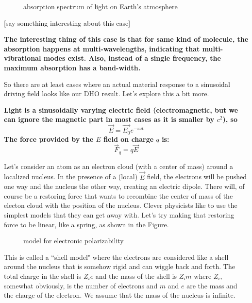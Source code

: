 \documentclass[]{revtex4}
\newcommand{\st}[1]{{\color{red}\bfseries #1}}
\begin{document}
  \begin{figure}[H]\begin{center}
      \caption{absorption spectrum of light on Earth's atmosphere}
  \end{center}\end{figure}
  [say something interesting about this case]
  
  \st{
    The interesting thing of this case is that for same kind of molecule, the absorption happens at multi-wavelengths, indicating that multi-vibrational modes exist. Also, instead of a single frequency, the maximum absorption has a band-width.
  }
  
  
  So there are at least cases where an actual material response to a sinusoidal driving field looks like our DHO result.  Let's explore this a bit more.
  
  \st{ Light is a sinusoidally varying electric field (electromagnetic, but we can ignore the magnetic part in most cases as it is smaller by $c^2$),
    so}
  \[\vec{E} = \vec{E_0}e^{-i\omega t}\]
  \st{
    The force provided by the $E$ field on charge $q$ is:
  }
  \[\vec{F}_q = q\vec{E}\]
  
  Let's consider an atom as an electron cloud (with a center of mass) around a localized nucleus.  In the presence of a (local) $\vec{E}$ field, the electrons
  will be pushed one way and the nucleus the other way, creating an electric dipole.  There will, of course be a restoring force that wants to recombine the
  center of mass of the electon cloud with the position of the nucleus.  Clever physicists like to use the simplest models that they can get away with.
  Let's try making that restoring force to be linear, like a spring, as shown in the Figure.
  \begin{figure}[H]\begin{center}
      \caption{model for electronic polarizability}
  \end{center}\end{figure}
  This is called a ``shell model" where the electrons are considered like a shell around the nucleus that is somehow rigid and can wiggle back and forth.  The
  total charge in the shell is $Z_ie$ and the mass of the shell is $Z_im$ where $Z_i$, somewhat obviously, is the number of electrons and $m$ and $e$ are the mass
  and the charge of the electron.  We assume that the mass of the nucleus is infinite.
  
\end{document}
